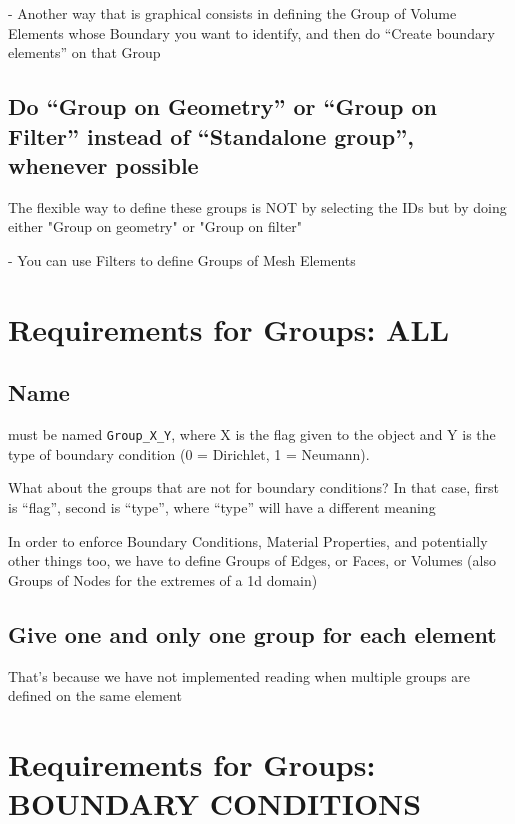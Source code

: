 \documentclass[10pt]{book}
\begin{document}
 - Another way that is graphical consists in defining the Group of Volume Elements
 whose Boundary you want to identify,
 and then do ``Create boundary elements'' on that Group
 
 
 \subsection{Do ``Group on Geometry'' or ``Group on Filter'' instead of ``Standalone group'',
          whenever possible}
          
    The flexible way to define these groups is NOT by selecting the IDs but by doing either "Group on geometry" or "Group on filter"

- You can use Filters to define Groups of Mesh Elements

        
          
\section{Requirements for Groups: ALL}


\subsection{Name}

  must be named \verb|Group_X_Y|, where X is the flag given to the object and Y is the type of boundary condition (0 = Dirichlet, 1 = Neumann).
  
  
  What about the groups that are not for boundary conditions? In that case, first is ``flag'', second is ``type'', where ``type'' will have
  a different meaning

  In order to enforce Boundary Conditions, Material Properties, and potentially other things too,
  we have to define Groups of Edges, or Faces, or Volumes (also Groups of Nodes for the extremes of a 1d domain)
  


\subsection{Give one and only one group for each element}

 That's because we have not implemented reading when multiple groups are defined on the same element

\section{Requirements for Groups: BOUNDARY CONDITIONS}
\end{document}
